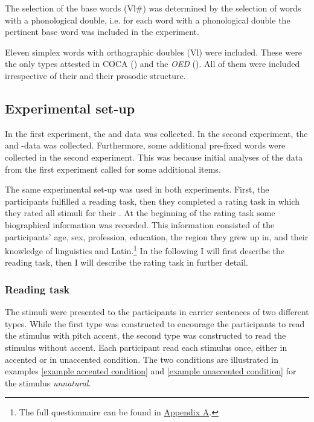 The selection of the base words (Vl\#) was determined by the selection of words with a phonological double, i.e.  for each word with a phonological double the pertinent base word was included in the experiment. 

Eleven simplex words with orthographic doubles (Vl) were included. These were the only types attested in  {COCA} (\citealt{Davies.20082014}) and the \textit{OED} (\citealt{OED.2013}). 
All of them were included irrespective of their  and their prosodic structure. 





\subsection{Experimental set-up}

In the first experiment, the  and data was collected.
In the second experiment, the  and -data was collected. Furthermore, some additional pre-fixed words were collected in the second experiment. 
This was because initial analyses of the data from the first experiment called for some additional items.
 
 The same experimental set-up was used in both experiments. First, the participants fulfilled a reading task, then they completed a rating task in which they rated all stimuli for their . 
 At the beginning of the rating task some biographical information was recorded. This information consisted of the participants' age, sex, profession, education, the region they grew up in, and their knowledge of linguistics and Latin.\footnote{The full questionnaire can be found in \hyperref[Appendix A: Decomposability Rating]{Appendix A}.}  In the following I will first describe the reading task, then I will describe the rating task in further detail. 

\subsubsection{Reading task}


The stimuli were presented to the participants in carrier sentences of two different types. 
While the first type was constructed to encourage the participants to read the stimulus with pitch accent, the second type was constructed to read the stimulus without accent. Each participant read each stimulus once, either in accented or in unaccented condition. 
The two conditions are illustrated in examples \ref{example accented condition}  and \ref{example unaccented condition} for the stimulus \textit{unnatural}.  


